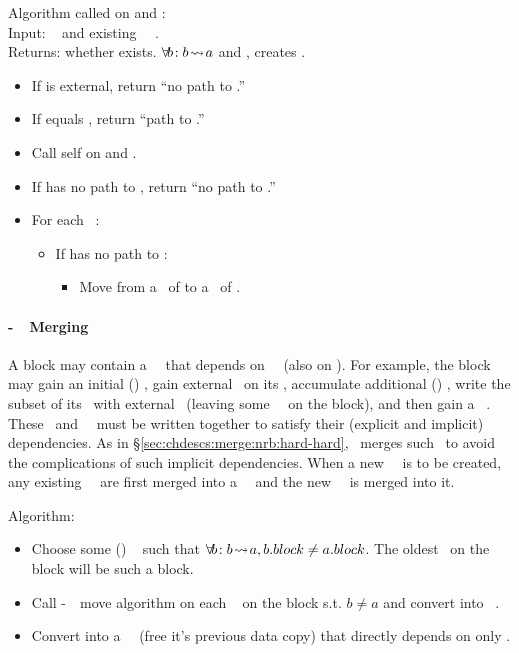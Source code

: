 \noindent Algorithm called on  and :\\
Input: \chdesc\  and existing \nrb\ \chdesc\ .\\
Returns: whether  exists. \(\forall\! \p{b}\!: \indirdepends{a}{b}\) and , creates .

\begin{itemize}
\item If  is external, return ``no path to .''
\item If  equals , return ``path to .''
\item Call self on  and .
\item If  has no path to , return ``no path to .''
\item For each  \before\ :
  \begin{itemize}
    \item If  has no path to :
      \begin{itemize}
      \item Move  from a \before\ of  to a \before\ of .
      \end{itemize}
  \end{itemize}
\end{itemize}

\paragraph{\Nrb-\Rb\ \ChDesc\ Merging}
\label{sec:chdescs:merge:nrb:hard-soft}
A block  may contain a \nrb\ \chdesc\ that depends on \rb\ \chdescs\
(also on ).
%
For example, the block may gain an initial (\nrb{}) \chdesc, gain
external \afters\ on its \chdesc, accumulate additional (\rb{})
\chdescs, write the subset of its \chdescs\ with external \afters\
(leaving some \rb\ \chdescs\ on the block), and then gain a \nrb\
\chdesc.
%
These \rb\ and \nrb\ \chdescs\ must be written together to satisfy
their (explicit and implicit) dependencies.
%
As in \S\ref{sec:chdescs:merge:nrb:hard-hard}, \Kudos\ merges
such \chdescs\ to avoid the complications of such implicit
dependencies.  When a new \nrb\ \chdesc\ is to be created, any
existing \rb\ \chdescs\ are first merged into a \nrb\ \chdesc\
and the new \nrb\ \chdesc\ is merged into it.

\noindent Algorithm:
\begin{itemize}
\item Choose some (\rb{}) \chdesc\  such that
\(\forall\! b\!: \indirdepends{a}{b}, \blockof{b} \ne \blockof{a}\).
The oldest \chdesc\ on the block will be such a block.
\item Call \nrb-\nrb\ \before\ move algorithm on each \chdesc\ 
on the block s.t. \(b \ne a\) and convert \p{b} into \anoop\ \chdesc.
\item Convert \p{a} into a \nrb\ \chdesc\ (free it's previous data copy)
that directly depends on only \p{a}.
\end{itemize}

